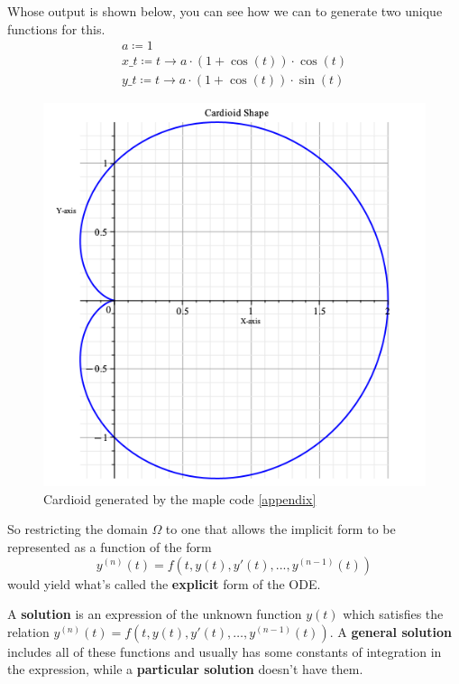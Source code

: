 Whose output is shown below, you can see how we can to generate two unique functions for this.
\begin{align*}
	a \coloneq 1 \\
	x\_t \coloneqq t \rightarrow a \cdot \left(1+\cos  \left(t \right)\right)\cdot \cos \left(t \right) \\
	y\_t \coloneqq t \rightarrow a \cdot \left(1+\cos \left(t \right)\right)\cdot \sin \left(t \right)
\end{align*}

\begin{figure}[H]
	\centering
	\includegraphics[width=\textwidth-7cm]{math_pics/maple-cardioid.png}
	\caption{Cardioid generated by the maple code \ref{appendix}}
	\label{fig:cardioid}
\end{figure}

So restricting the domain $\Omega$ to one that allows the implicit form to be represented as a function of the form
\begin{equation}\label{implicit_func_theorem}
	y^{(n)}(t)=f(t,y(t),y'(t),...,y^{(n-1)}(t))
\end{equation}
would yield what's called the \textbf{explicit} form of the ODE.

A \textbf{solution} is an expression of the unknown function $y(t)$ which satisfies the relation
$y^{(n)}(t) = f(t,y(t),y'(t),\dots,y^{(n-1)}(t))$. A \textbf{general solution} includes all of these functions and usually has some constants of integration in the expression, while a \textbf{particular solution} doesn't have them.

